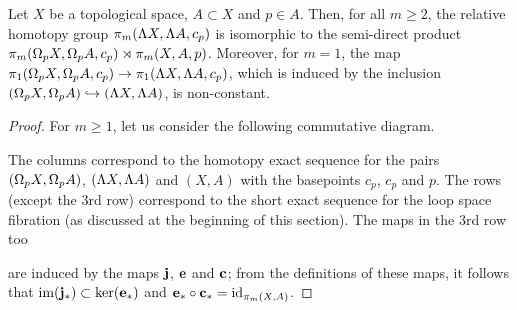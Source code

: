 \documentclass[11pt,twoside]{article}
\begin{document}
\begin{pro}\label{p.rel.htp}
	Let \(X\) be a topological space, \(A\subset X\) and $p\in A$. Then, for all \(m\geq 2\), the relative homotopy group \(\pi_m(\Lambda X, \Lambda A, c_p)\) is isomorphic to the semi-direct product \(\pi_m(\Omega_p X,\\ \Omega_p A, c_p)\rtimes \pi_m(X,A, p)\). Moreover, for $m=1$, the map \(\pi_1(\Omega_p X, \Omega_p A, c_p) \rightarrow \pi_1(\Lambda X, \Lambda A, c_p)\), which is induced by the inclusion \((\Omega_p X, \Omega_p A)\hookrightarrow (\Lambda X, \Lambda A)\), is non-constant. 
\end{pro}
\begin{proof} For \(m\geq 1\), let us consider the following commutative diagram.
\begin{center}
\end{center}

The columns correspond to the homotopy exact sequence for the pairs \((\Omega_pX, \Omega_p A)\), \((\Lambda X, \Lambda A)\) and \((X,A)\) with the basepoints $c_p$, $c_p$ and $p$. The rows (except the 3rd row) correspond to the short exact sequence for the loop space fibration (as discussed at the beginning of this section). The maps in the 3rd row too
\begin{center}
\end{center}
are induced by the maps \(\mathbf{j}\), \(\mathbf{e}\) and \(\mathbf{c}\); from the definitions of these maps, it follows that \(\text{im}(\mathbf{j}_*)\subset \ker(\mathbf{e}_*)\) and \(\mathbf{e}_*\circ\mathbf{c}_*=\text{id}_{\pi_m(X,A)}\). 


\end{proof}
\end{document}
